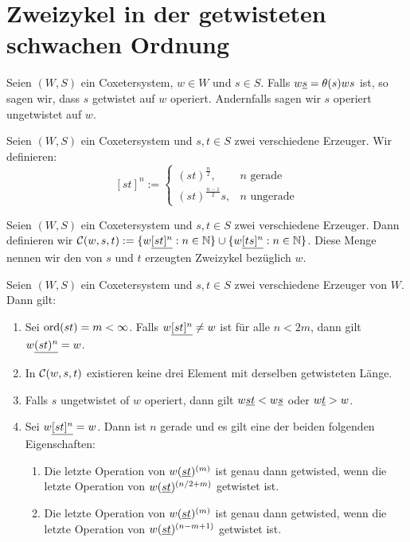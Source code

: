 \section{Zweizykel in der getwisteten schwachen Ordnung}

\begin{defi}
Seien $(W,S)$ ein Coxetersystem, $w \in W$ und $s \in S$. Falls $w \underline{s} =
\theta(s)ws$ ist, so sagen wir, dass $s$ getwistet auf $w$ operiert. Andernfalls
sagen wir $s$ operiert ungetwistet auf $w$.
\end{defi}

\begin{defi}
Seien $(W,S)$ ein Coxetersystem und $s,t \in S$ zwei
verschiedene Erzeuger. Wir definieren:
$$[st]^n :=
\begin{cases}
(st)^{\frac{n}{2}}, & n \textrm{ gerade} \\
(st)^{\frac{n-1}{2}}s, & n \textrm{ ungerade} 
\end{cases}$$
\end{defi}

\begin{defi}[Zweizykel]
Seien $(W,S)$ ein Coxetersystem und $s,t \in S$ zwei verschiedene Erzeuger. Dann
definieren wir $\mathcal{C}({w},{s},{t}) := \{ w \underline{[st]^n} : n \in \mathbb{N} \} \cup \{ w
\underline{[ts]^n} : n \in \mathbb{N} \}$. Diese Menge nennen wir den von $s$ und $t$
erzeugten Zweizykel bezüglich $w$.
\end{defi}

\begin{verm}
Seien $(W,S)$ ein Coxetersystem und $s,t \in S$ zwei verschiedene Erzeuger
von $W$. Dann gilt:
\begin{enumerate}
  \item \label{verm:max-twocycle-length} Sei $\operatorname{ord}(st) = m < \infty$. Falls $w \underline{[st]^n}
  \neq w$ ist für alle $n < 2m$, dann gilt $w \underline{(st)^n} = w$.
  \item \label{verm:twocycle-is-convex} In $\mathcal{C}({w},{s},{t})$ existieren keine drei
  Element mit derselben getwisteten Länge.
  \item \label{verm:untwisted-operations-only-at-top-or-bottom-end-of-twocycle}
  Falls $s$ ungetwistet of $w$ operiert, dann gilt $w \underline{st} < w \underline{s}$ oder $w \underline{t} > w$.
  \item \label{verm:twocycle-symmetry} Sei $w \underline{[st]^n} = w$. Dann ist $n$
  gerade und es gilt eine der beiden folgenden Eigenschaften:
  	\begin{enumerate}
  	  \item Die letzte Operation von $w (\underline{st})^{(m)}$ ist genau dann
  	  getwisted, wenn die letzte Operation von $w (\underline{st})^{(n/2+m)}$ getwistet
  	  ist.
  	  \item Die letzte Operation von $w (\underline{st})^{(m)}$ ist genau dann
  	  getwisted, wenn die letzte Operation von $w (\underline{st})^{(n-m+1)}$ getwistet
  	  ist.
  	\end{enumerate}
\end{enumerate}
\end{verm}

